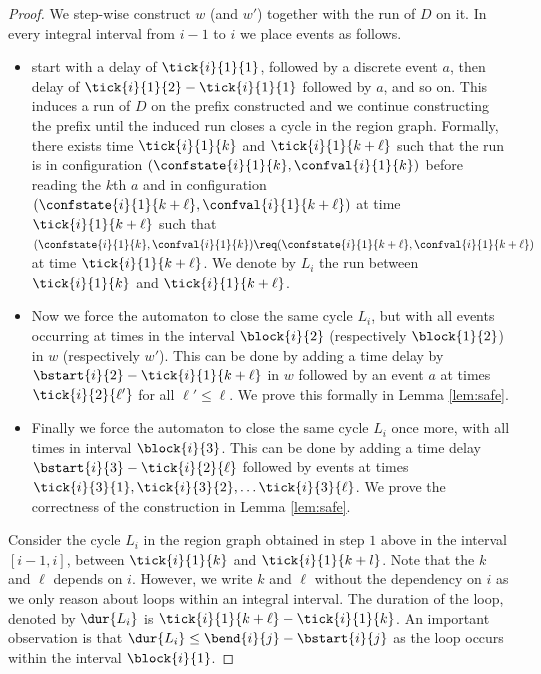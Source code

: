 \begin{proof}
We step-wise construct $w$ (and $w'$) together with the run of $D$ on it.
In every integral interval from $i-1$ to $i$ we place events as follows.

\begin{itemize}
    \item start with a delay of $\tick{i}{1}{1}$,
    followed by a discrete event $a$, then delay of  $\tick{i}{1}{2}-\tick{i}{1}{1}$ followed by $a$,
    and so on. This induces a run of $D$ on the prefix constructed and we continue constructing the prefix until the induced run closes a cycle in the region graph. Formally, there exists time $\tick{i}{1}{k}$ 
    and $\tick{i}{1}{k+\ell}$ such that the run is in configuration 
    $(\confstate{i}{1}{k}, \confval{i}{1}{k})$ before reading the $k$th $a$ and in configuration $(\confstate{i}{1}{k+\ell}, \confval{i}{1}{k+\ell})$ at time $\tick{i}{1}{k+\ell}$ such that 
    $(\confstate{i}{1}{k}, \confval{i}{1}{k}) \req (\confstate{i}{1}{k+\ell}, \confval{i}{1}{k+\ell})$ at time $\tick{i}{1}{k+\ell}$.
    We denote by $L_i$ the run between $\tick{i}{1}{k}$ and $\tick{i}{1}{k+\ell}$. 
    
    \item Now we force  the automaton to close the same cycle $L_i$, but with all events occurring at times in the interval $\block{i}{2}$ (respectively $\block{1}{2}$) in $w$ (respectively $w'$).
    This can be done by adding a time delay by $\bstart{i}{2}-\tick{i}{1}{k+\ell}$ 
    in $w$ followed by an event $a$ at times $\tick{i}{2}{\ell'}$ for all $\ell'\leq \ell$. 
    We prove this formally in Lemma \ref{lem:safe}.
        
    
    \item Finally we force the automaton to close the same cycle $L_i$ once more, with all times
        in interval $\block{i}{3}$.
        This can be done by adding a time delay $\bstart{i}{3}-\tick{i}{2}{\ell}$ followed by events at times
        $\tick{i}{3}{1},
        \tick{i}{3}{2},\ldots
        \tick{i}{3}{\ell}
        $.
      We prove the correctness of the construction in Lemma \ref{lem:safe}.
  
\end{itemize}

Consider the cycle $L_i$ in the region graph obtained in step $1$ above in the interval $[i-1,i]$, between $\tick{i}{1}{k}$ and $\tick{i}{1}{k+l}$. Note that the $k$ and $\ell$ depends on $i$. However, we write $k$ and $\ell$ 
without
the dependency on $i$ 
as we only reason about loops within an integral interval.
The duration of the loop, denoted by $\dur{L_i}$ is $\tick{i}{1}{k+\ell}-\tick{i}{1}{k}$.
An important observation is that $\dur{L_i}\leq \bend{i}{j}-\bstart{i}{j}$ as the loop occurs within the interval $\block{i}{1}$. 
  

\end{proof}
